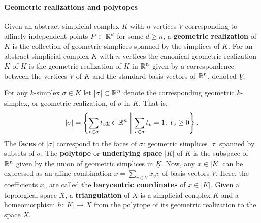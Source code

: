\paragraph{Geometric realizations and polytopes}



Given an abstract simplicial complex $K$ with $n$ vertices $V$ corresponding to affinely independent points $P\subset\mathbb{R}^d$ for some $d\geq n$, a \textbf{geometric realization} of $K$ is the collection of geometric simplices spanned by the simplices of $K$.
For an abstract simplicial complex $K$ with $n$ vertices the canonical geometric realization $\underline{K}$ of $K$ is the geometric realization of $K$ in $\mathbb{R}^n$ given by a correspondence between the vertices $V$ of $K$ and the standard basis vectors of $\mathbb{R}^n$, denoted $\underline{V}$.

For any $k$-simplex $\sigma\in K$ let $|\sigma|\subset\mathbb{R}^n$ denote the corresponding geometric $k$-simplex, or geometric realization, of $\sigma$ in $\underline{K}$.
That is,
\[ |\sigma| = \left\{ \sum_{v\in\sigma} t_v \underline{v}\in\RR^n\ \middle\vert\  \sum_{v\in\sigma} t_v = 1,\ t_v\geq 0\right\}.\]
The \textbf{faces} of $|\sigma|$ correspond to the faces of $\sigma$: geometric simplices $|\tau|$ spanned by subsets of $\sigma$.
The \textbf{polytope} or \textbf{underlying space} $|K|$ of $K$ is the subspace of $\mathbb{R}^n$ given by the union of geometric simplices in $\underline{K}$.
Now, any $x\in |K|$ can be expressed as an affine combination $x= \sum_{v\in V} x_v\underline{v}$ of basis vectors $\underline{V}$.
Here, the coefficients $x_v$ are called the \textbf{barycentric coordinates} of $x\in |K|$.
Given a topological space $X$, a \textbf{triangulation} of $X$ is a simplicial complex $K$ and a homeomorphism $h : |K|\to X$ from the polytope of its geometric realization to the space $X$.

